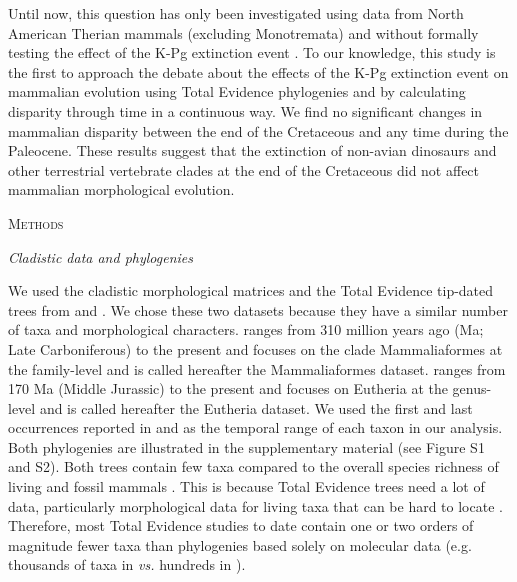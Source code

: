 \documentclass[12pt,letterpaper]{article}
\renewcommand{\section}[1]{%
\bigskip
\begin{center}
\begin{Large}
\normalfont\scshape #1
\medskip
\end{Large}
\end{center}}
\renewcommand{\subsection}[1]{%
\bigskip
\begin{center}
\begin{large}
\normalfont\itshape #1
\end{large}
\end{center}}
\begin{document}
Until now, this question has only been investigated using data from North American Therian mammals (excluding Monotremata) and without formally testing the effect of the K-Pg extinction event \citep{Wilson2013}.
To our knowledge, this study is the first to approach the debate about the effects of the K-Pg extinction event on mammalian evolution using Total Evidence phylogenies and by calculating disparity through time in a continuous way.
We find no significant changes in mammalian disparity between the end of the Cretaceous and any time during the Paleocene. 
These results suggest that the extinction of non-avian dinosaurs and other terrestrial vertebrate clades at the end of the Cretaceous did not affect mammalian morphological evolution.

%
%

\section{Methods}

\subsection{Cladistic data and phylogenies}
We used the cladistic morphological matrices and the Total Evidence tip-dated trees \citep{ronquista2012} from \citet[][103 taxa with 446 morphological characters;]{Slater2012MEE} and \citet[][102 taxa with 421 morphological characters]{beckancient2014}.
We chose these two datasets because they have a similar number of taxa and morphological characters.
\cite{Slater2012MEE} ranges from 310 million years ago (Ma; Late Carboniferous) to the present and focuses on the clade Mammaliaformes at the family-level and is called hereafter the Mammaliaformes dataset.
\cite{beckancient2014} ranges from 170 Ma (Middle Jurassic) to the present and focuses on Eutheria at the genus-level and is called hereafter the Eutheria dataset.
We used the first and last occurrences reported in \cite{Slater2012MEE} and \cite{beckancient2014} as the temporal range of each taxon in our analysis.
Both phylogenies are illustrated in the supplementary material (see Figure S1 and S2).
Both trees contain few taxa compared to the overall species richness of living and fossil mammals \citep{bininda2007delayed,archibald2011extinction}.
This is because Total Evidence trees need a lot of data, particularly morphological data for living taxa that can be hard to locate \citep{GuillermeCooper}.
Therefore, most Total Evidence studies to date contain one or two orders of magnitude fewer taxa than phylogenies based solely on molecular data (e.g. thousands of taxa in \citealt{bininda2007delayed,meredithimpacts2011} \textit{vs.} hundreds in \citealt{ronquista2012,Slater2012MEE,Wood01032013,beckancient2014}).
\end{document}
